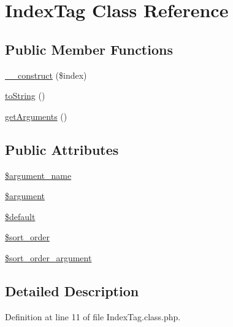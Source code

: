 \hypertarget{classIndexTag}{\section{Index\-Tag Class Reference}
\label{classIndexTag}
}
\subsection*{Public Member Functions}
\begin{DoxyCompactItemize}
\item 
\hyperlink{classIndexTag_a0ce08c44eb5c802442712810c97cb070}{\-\_\-\-\_\-construct} (\$index)
\item 
\hyperlink{classIndexTag_a2ba180bac75a74b01c98c1494fc63b60}{to\-String} ()
\item 
\hyperlink{classIndexTag_ab9bdd9fa34e0a7173dcf5e09269b8d36}{get\-Arguments} ()
\end{DoxyCompactItemize}
\subsection*{Public Attributes}
\begin{DoxyCompactItemize}
\item 
\hyperlink{classIndexTag_a92f6892b11fed081293fdaabb58f36a0}{\$argument\-\_\-name}
\item 
\hyperlink{classIndexTag_a5d1d862f8c1ebcd6ddb15bb2c9da2e4b}{\$argument}
\item 
\hyperlink{classIndexTag_ae24a36bb56ebc33a9161a64b12f92f18}{\$default}
\item 
\hyperlink{classIndexTag_a68336fd5e6a3fa09e2659359cce027fb}{\$sort\-\_\-order}
\item 
\hyperlink{classIndexTag_af25bb5754a767188b72ee872e35414e6}{\$sort\-\_\-order\-\_\-argument}
\end{DoxyCompactItemize}


\subsection{Detailed Description}


Definition at line 11 of file Index\-Tag.\-class.\-php.




